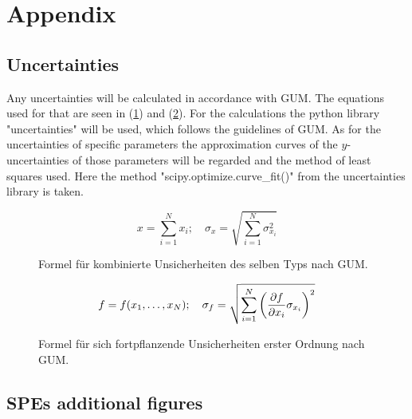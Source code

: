 \appendix
\section{Appendix}\label{sec:appendix}

\subsection{Uncertainties}\label{sec:uncertainties}

Any uncertainties will be calculated in accordance with GUM.
The equations used for that are seen in (\ref{fig:GUM_combine}) and (\ref{fig:GUM_formula}).
For the calculations the python library "uncertainties" will be used, which follows the guidelines of GUM.
As for the uncertainties of specific parameters the approximation curves of the $y$-uncertainties of those parameters will be regarded and the method of least squares used.
Here the method "scipy.optimize.curve\_fit()" from the uncertainties library is taken.

\begin{figure}[ht]
	\begin{equation*}
	x = \sum_{i=1}^{N} x_i
	;\quad
	\sigma_x = \sqrt{\sum_{i = 1}^{N} \sigma_{x_i}^2}
	\end{equation*}
	\caption{Formel für kombinierte Unsicherheiten des selben Typs nach GUM.}
	\label{fig:GUM_combine}
\end{figure}

\begin{figure}[ht]
	\begin{align*}
	f = f(x_1, \dots , x_N)
	;\quad
	\sigma_f = \sqrt{\sum_{i = 1}^{N}\left(\pdv{f}{x_i} \sigma_{x_i}\right) ^2}
	\end{align*}
	\caption{Formel für sich fortpflanzende Unsicherheiten erster Ordnung nach GUM.}
	\label{fig:GUM_formula}
\end{figure}


\newpage
\subsection{SPEs additional figures}
\label{sec:anhang:spe}

